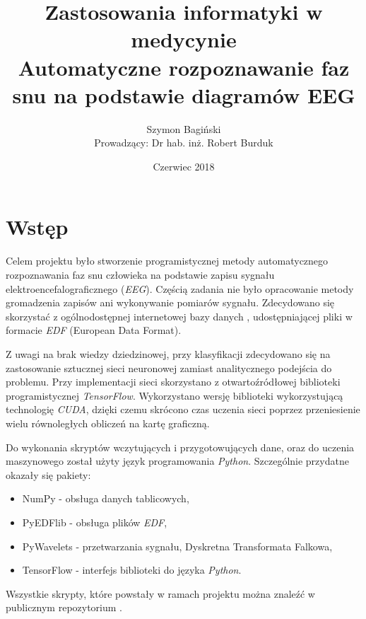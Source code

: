 \documentclass[12pt]{report}
\title{\Huge Zastosowania informatyki w medycynie \\[1cm]\Huge Automatyczne rozpoznawanie faz snu na podstawie diagramów EEG}
\author{Szymon Bagiński \\[1cm]{\small Prowadzący: Dr hab. inż. Robert Burduk}}
\date{Czerwiec 2018}
\begin{document}
    \begin{titlepage}
        \maketitle
    \end{titlepage}
    
    \tableofcontents

    \chapter*{Wstęp}
        Celem projektu było stworzenie programistycznej metody automatycznego rozpoznawania faz snu człowieka na podstawie zapisu sygnału elektroencefalograficznego (\textit{EEG}). Częścią zadania nie było opracowanie metody gromadzenia zapisów ani wykonywanie pomiarów sygnału. Zdecydowano się skorzystać z ogólnodostępnej internetowej bazy danych \cite{}, udostępniającej pliki w formacie \textit{EDF} (European Data Format). %

        Z uwagi na brak wiedzy dziedzinowej, przy klasyfikacji zdecydowano się na zastosowanie sztucznej sieci neuronowej zamiast analitycznego podejścia do problemu. Przy implementacji sieci skorzystano z otwartoźródłowej biblioteki programistycznej \textit{TensorFlow}. Wykorzystano wersję biblioteki wykorzystującą technologię \textit{CUDA}, dzięki czemu skrócono czas uczenia sieci poprzez przeniesienie wielu równoległych obliczeń na kartę graficzną. %

        Do wykonania skryptów wczytujących i przygotowujących dane, oraz do uczenia maszynowego został użyty język programowania \textit{Python}. Szczególnie przydatne okazały się pakiety:
        \begin{itemize}
            \item NumPy - obsługa danych tablicowych,
            \item PyEDFlib - obsługa plików \textit{EDF},
            \item PyWavelets - przetwarzania sygnału, Dyskretna Transformata Falkowa,
            \item TensorFlow - interfejs biblioteki do języka \textit{Python}.
        \end{itemize}

        Wszystkie skrypty, które powstały w ramach projektu można znaleźć w publicznym repozytorium \cite{}. %
\end{document}
